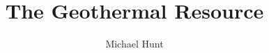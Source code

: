 \documentclass[a4paper,12pt,fleqn]{article}
\begin{document}
\title{The Geothermal Resource}
\author{Michael Hunt}
\date{}
\maketitle

\end{document}
